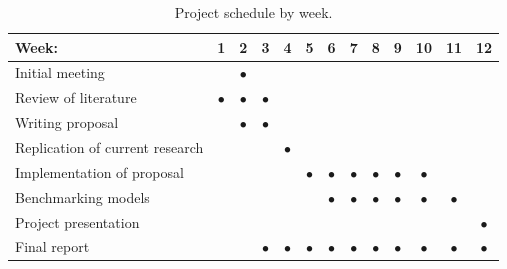 \documentclass[a4paper, draft, 12pt]{article}
\newcommand{\x}{$\bullet$}
\begin{document}
\begin{table}[ht]
    \centering
    \setlength{\tabcolsep}{5pt}
    \renewcommand{\arraystretch}{1.25}
    \begin{tabular}{|l|*{12}{c|}}
        \hline
        Week:                           & 1  & 2  & 3  & 4  & 5  & 6  & 7  & 8  & 9  & 10 & 11 & 12 \\
        \hline
        Initial meeting                 &    & \x &    &    &    &    &    &    &    &    &    &    \\
        Review of literature            & \x & \x & \x &    &    &    &    &    &    &    &    &    \\
        Writing proposal                &    & \x & \x &    &    &    &    &    &    &    &    &    \\
        Replication of current research &    &    &    & \x &    &    &    &    &    &    &    &    \\
        Implementation of proposal      &    &    &    &    & \x & \x & \x & \x & \x & \x &    &    \\
        Benchmarking models             &    &    &    &    &    & \x & \x & \x & \x & \x & \x &    \\
        Project presentation            &    &    &    &    &    &    &    &    &    &    &    & \x \\
        Final report                    &    &    & \x & \x & \x & \x & \x & \x & \x & \x & \x & \x \\
        \hline
    \end{tabular}
    \caption{Project schedule by week.}
    \label{tab:timeline}
\end{table}

\clearpage


\end{document}
